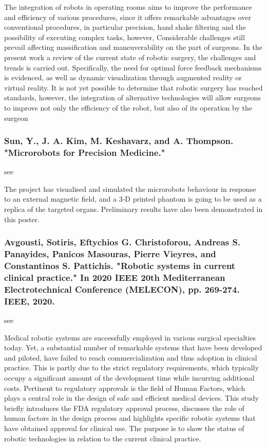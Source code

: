 \documentclass[conference]{IEEEtran}
\begin{document}
The integration of robots in operating rooms aims to improve the performance and efficiency of various procedures, since it offers remarkable advantages over conventional procedures, in particular precision, hand shake filtering and the possibility of executing complex tasks, however, Considerable challenges still prevail affecting massification and maneuverability on the part of surgeons. In the present work a review of the current state of robotic surgery, the challenges and trends is carried out. Specifically, the need for optimal force feedback mechanisms is evidenced, as well as dynamic visualization through augmented reality or virtual reality. It is not yet possible to determine that robotic surgery has reached standards, however, the integration of alternative technologies will allow surgeons to improve not only the efficiency of the robot, but also of its operation by the surgeon

\medskip
\subsubsection{Sun, Y., J. A. Kim, M. Keshavarz, and A. Thompson. "Microrobots for Precision Medicine."}
see \cite{sunmicrorobots}

The project has visualised and simulated the microrobots behaviour in
response to an external magnetic field, and a 3‐D printed phantom is
going to be used as a replica of the targeted organs. Preliminary results
have also been demonstrated in this poster.


\medskip
\subsubsection{Avgousti, Sotiris, Eftychios G. Christoforou, Andreas S. Panayides, Panicos Masouras, Pierre Vieyres, and Constantinos S. Pattichis. "Robotic systems in current clinical practice." In 2020 IEEE 20th Mediterranean Electrotechnical Conference (MELECON), pp. 269-274. IEEE, 2020.}
see \cite{avgousti2020robotic}

Medical robotic systems are successfully employed in various surgical specialties today. Yet, a substantial number of remarkable systems that have been developed and piloted, have failed to reach commercialization and thus adoption in clinical practice. This is partly due to the strict regulatory requirements, which typically occupy a significant amount of the development time while incurring additional costs. Pertinent to regulatory approvals is the field of Human Factors, which plays a central role in the design of safe and efficient medical devices. This study briefly introduces the FDA regulatory approval process, discusses the role of human factors in the design process and highlights specific robotic systems that have obtained approval for clinical use. The purpose is to show the status of robotic technologies in relation to the current clinical practice.
\end{document}
